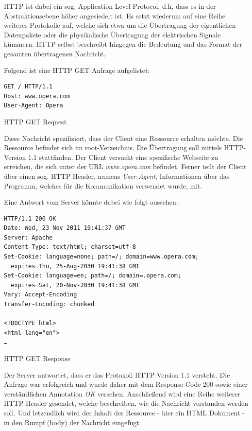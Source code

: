 HTTP ist dabei ein sog. Application Level Protocol, d.h, dass es in der Abstraktionsebene höher angesiedelt ist. Es setzt wiederum auf eine Reihe weiterer Protokolle auf, welche sich etwa um die Übertragung der eigentlichen Datenpakete oder die physikalische Übertragung der elektrischen Signale kümmern. HTTP selbst beschreibt hingegen die Bedeutung und das Format der gesamten übertragenen Nachricht.

Folgend ist eine HTTP GET Anfrage aufgelistet:

\begin{listing}[H]
\begin{verbatim}
GET / HTTP/1.1
Host: www.opera.com
User-Agent: Opera
\end{verbatim}
\caption{HTTP GET Request}
\end{listing}

Diese Nachricht spezifiziert, dass der Client eine Ressource erhalten möchte.
Die Ressource befindet sich im root-Verzeichnis.
Die Übertragung soll mittels HTTP-Version 1.1 stattfinden. Der Client versucht eine spezifische Webseite zu erreichen, die sich unter der URL \emph{www.opera.com} befindet. Ferner teilt der Client über einen sog. HTTP Header, namens \emph{User-Agent}, Informationen über das Programm, welches für die Kommunikation verwendet wurde, mit.

Eine Antwort vom Server könnte dabei wie folgt aussehen:

\begin{listing}[H]
\begin{verbatim}
HTTP/1.1 200 OK
Date: Wed, 23 Nov 2011 19:41:37 GMT
Server: Apache
Content-Type: text/html; charset=utf-8
Set-Cookie: language=none; path=/; domain=www.opera.com;
  expires=Thu, 25-Aug-2030 19:41:38 GMT
Set-Cookie: language=en; path=/; domain=.opera.com;
  expires=Sat, 20-Nov-2030 19:41:38 GMT
Vary: Accept-Encoding
Transfer-Encoding: chunked

<!DOCTYPE html>
<html lang="en">
…
\end{verbatim}
\caption{HTTP GET Response}
\end{listing}

Der Server antwortet, dass er das Protokoll HTTP Version 1.1 versteht. Die Anfrage war erfolgreich und wurde daher mit dem Response Code 200 sowie einer verständlichen Annotation \textit{OK} versehen. Anschließend wird eine Reihe weiterer HTTP Header gesendet, welche beschreiben, wie die Nachricht verstanden werden soll. Und letzendlich wird der Inhalt der Ressource - hier ein HTML Dokument - in den Rumpf (body) der Nachricht eingefügt.

